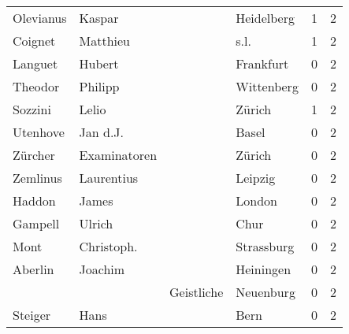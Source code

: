 \documentclass[10pt,a4paper,landscape]{article}
\begin{document}
\begin{longtable}{llllrr}
                Olevianus &                             Kaspar &             &                                  Heidelberg &          1 &         2 \\
                  Coignet &                           Matthieu &             &                                        s.l. &          1 &         2 \\
                  Languet &                             Hubert &             &                                   Frankfurt &          0 &         2 \\
                  Theodor &                            Philipp &             &                                  Wittenberg &          0 &         2 \\
                  Sozzini &                              Lelio &             &                                      Zürich &          1 &         2 \\
                 Utenhove &                           Jan d.J. &             &                                       Basel &          0 &         2 \\
                  Zürcher &                       Examinatoren &             &                                      Zürich &          0 &         2 \\
                 Zemlinus &                         Laurentius &             &                                     Leipzig &          0 &         2 \\
                   Haddon &                              James &             &                                      London &          0 &         2 \\
                  Gampell &                             Ulrich &             &                                        Chur &          0 &         2 \\
                     Mont &                         Christoph. &             &                                  Strassburg &          0 &         2 \\
                  Aberlin &                            Joachim &             &                                   Heiningen &          0 &         2 \\
                          &                                    &  Geistliche &                                   Neuenburg &          0 &         2 \\
                  Steiger &                               Hans &             &                                        Bern &          0 &         2 \\

\end{longtable}
\end{document}
